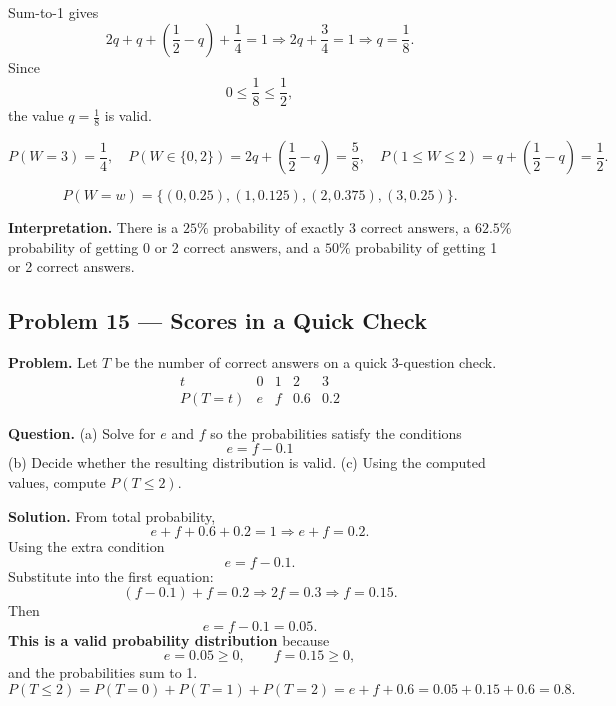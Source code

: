 \begin{ExamProblems}
		Sum-to-1 gives
		\[
		2q+q+\left(\frac{1}{2}-q\right)+\frac{1}{4}=1
		\Rightarrow 2q+\frac{3}{4}=1
		\Rightarrow q=\frac{1}{8}.
		\]
		Since
		\[
		0\le \frac{1}{8}\le \frac{1}{2},
		\]
		the value $q=\frac{1}{8}$ is valid.
		
		\[
		P(W=3)=\frac{1}{4},\quad
		P(W\in\{0,2\})=2q+\left(\frac{1}{2}-q\right)=\frac{5}{8},\quad
		P(1\le W\le 2)=q+\left(\frac{1}{2}-q\right)=\frac{1}{2}.
		\]
		
\[
		P(W=w)=\{(0,0.25),(1,0.125),(2,0.375),(3,0.25)\}.
		\]
\begin{center}
		\end{center}
\textbf{Interpretation.} There is a $25\%$ probability of exactly 3 correct answers, a $62.5\%$ probability of getting 0 or 2 correct answers, and a $50\%$ probability of getting 1 or 2 correct answers.
		
		
		
		
		\item
		\subsection*{Problem 15 — Scores in a Quick Check}
			\textbf{Problem.}
		Let $T$ be the number of correct answers on a quick 3-question check.
		\[
		\begin{array}{c|cccc}
			t & 0 & 1 & 2 & 3\\
			\hline
			P(T=t) & e & f & 0.6 & 0.2
		\end{array}
		\]
		
		\textbf{Question.}
		(a) Solve for $e$ and $f$ so the probabilities satisfy the conditions
		\[ e=f-0.1		\]
		(b) Decide whether the resulting distribution is valid.
		(c) Using the computed values, compute $P(T\le 2)$.
		
		\textbf{Solution.}
		From total probability,
		\[
		e+f+0.6+0.2=1\Rightarrow e+f=0.2.
		\]
		Using the extra condition
		\[
		e=f-0.1.
		\]
		Substitute into the first equation:
		\[
		(f-0.1)+f=0.2\Rightarrow 2f=0.3\Rightarrow f=0.15.
		\]
		Then
		\[
		e=f-0.1=0.05.
		\]
		\textbf{This is a valid probability distribution} because
		\[
		e=0.05\ge 0,\qquad f=0.15\ge 0,
		\]
		and the probabilities sum to 1.
		\[
		P(T\le 2)=P(T=0)+P(T=1)+P(T=2)=e+f+0.6=0.05+0.15+0.6=0.8.
		\]
		

\end{ExamProblems}
